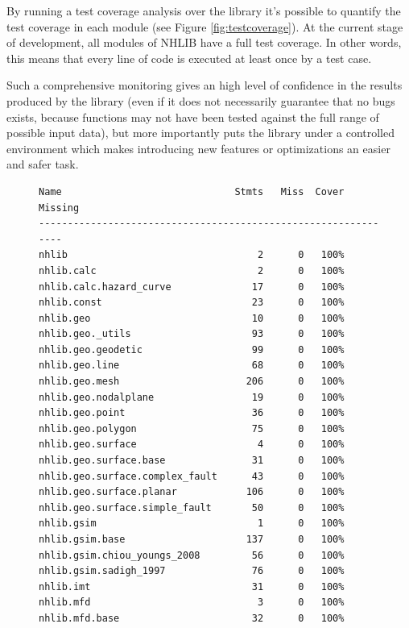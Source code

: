 \documentclass[11pt,a4paper,headings=small,dvips]{scrartcl}
\begin{document}
By running a test coverage analysis over the library it's possible to 
quantify the test coverage in each module (see Figure 
\ref{fig:testcoverage}). At the current stage of development, all 
modules of NHLIB have a full test coverage. In other words, this
means that every line of code is executed at least once by a test case. 

Such a comprehensive monitoring gives an high level of confidence in the results produced by the library (even if it does not necessarily guarantee that no bugs exists, because functions may not have been tested against the full range of possible input data), but more importantly puts the library under a controlled environment which makes introducing new features or optimizations an easier and safer task.\\

\begin{figure}[htbp]
\centering
\begin{Verbatim}[frame=single, commandchars=\\\{\}, fontsize=\scriptsize,samepage=true]
Name                              Stmts   Miss  Cover   Missing
---------------------------------------------------------------
nhlib                                 2      0   100%   
nhlib.calc                            2      0   100%   
nhlib.calc.hazard_curve              17      0   100%   
nhlib.const                          23      0   100%   
nhlib.geo                            10      0   100%   
nhlib.geo._utils                     93      0   100%   
nhlib.geo.geodetic                   99      0   100%   
nhlib.geo.line                       68      0   100%   
nhlib.geo.mesh                      206      0   100%   
nhlib.geo.nodalplane                 19      0   100%   
nhlib.geo.point                      36      0   100%   
nhlib.geo.polygon                    75      0   100%   
nhlib.geo.surface                     4      0   100%   
nhlib.geo.surface.base               31      0   100%   
nhlib.geo.surface.complex_fault      43      0   100%   
nhlib.geo.surface.planar            106      0   100%   
nhlib.geo.surface.simple_fault       50      0   100%   
nhlib.gsim                            1      0   100%   
nhlib.gsim.base                     137      0   100%   
nhlib.gsim.chiou_youngs_2008         56      0   100%   
nhlib.gsim.sadigh_1997               76      0   100%   
nhlib.imt                            31      0   100%   
nhlib.mfd                             3      0   100%   
nhlib.mfd.base                       32      0   100%   

\end{Verbatim}
\end{figure}
\end{document}
